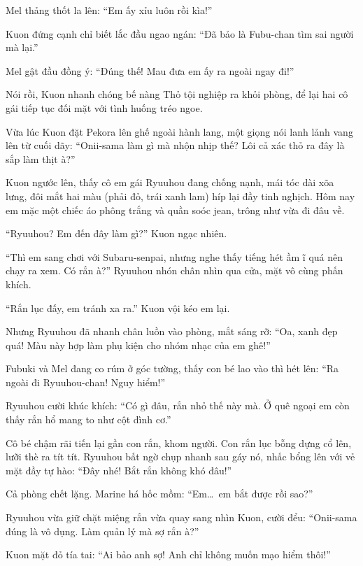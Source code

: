 \documentclass[../main.tex]{subfiles}
\begin{document}

Mel thảng thốt la lên: ``Em ấy xỉu luôn rồi kìa!''

Kuon đứng cạnh chỉ biết lắc đầu ngao ngán: ``Đã bảo là Fubu-chan tìm sai người mà lại.''

Mel gật đầu đồng ý: ``Đúng thế! Mau đưa em ấy ra ngoài ngay đi!''

Nói rồi, Kuon nhanh chóng bế nàng Thỏ tội nghiệp ra khỏi phòng, để lại hai cô gái tiếp tục đối mặt với tình huống tréo ngoe.

\ct
Vừa lúc Kuon đặt Pekora lên ghế ngoài hành lang, một giọng nói lanh lảnh vang lên từ cuối dãy:
``Onii-sama làm gì mà nhộn nhịp thế? Lôi cả xác thỏ ra đây là sắp làm thịt à?''

Kuon ngước lên, thấy cô em gái Ryuuhou đang chống nạnh, mái tóc dài xõa lưng, đôi mắt hai màu (phải đỏ, trái xanh lam) híp lại đầy tinh nghịch. Hôm nay em mặc một chiếc áo phông trắng và quần soóc jean, trông như vừa đi đâu về.

``Ryuuhou? Em đến đây làm gì?'' Kuon ngạc nhiên.

``Thì em sang chơi với Subaru-senpai, nhưng nghe thấy tiếng hét ầm ĩ quá nên chạy ra xem. Có rắn à?'' Ryuuhou nhón chân nhìn qua cửa, mặt vô cùng phấn khích.

``Rắn lục đấy, em tránh xa ra.'' Kuon vội kéo em lại.

Nhưng Ryuuhou đã nhanh chân luồn vào phòng, mắt sáng rỡ: ``Oa, xanh đẹp quá! Màu này hợp làm phụ kiện cho nhóm nhạc của em ghê!''

Fubuki và Mel đang co rúm ở góc tường, thấy con bé lao vào thì hét lên: ``Ra ngoài đi Ryuuhou-chan! Nguy hiểm!''

Ryuuhou cười khúc khích: ``Có gì đâu, rắn nhỏ thế này mà. Ở quê ngoại em còn thấy rắn hổ mang to như cột đình cơ.''

Cô bé chậm rãi tiến lại gần con rắn, khom người. Con rắn lục bỗng dựng cổ lên, lưỡi thè ra tít tít. Ryuuhou bất ngờ chụp nhanh sau gáy nó, nhấc bổng lên với vẻ mặt đầy tự hào: ``Đây nhé! Bắt rắn không khó đâu!''

Cả phòng chết lặng. Marine há hốc mồm: ``Em\dots\ em bắt được rồi sao?''

Ryuuhou vừa giữ chặt miệng rắn vừa quay sang nhìn Kuon, cười đểu: ``Onii-sama đúng là vô dụng. Làm quản lý mà sợ rắn à?''

Kuon mặt đỏ tía tai: ``Ai bảo anh sợ! Anh chỉ không muốn mạo hiểm thôi!''
\end{document}
